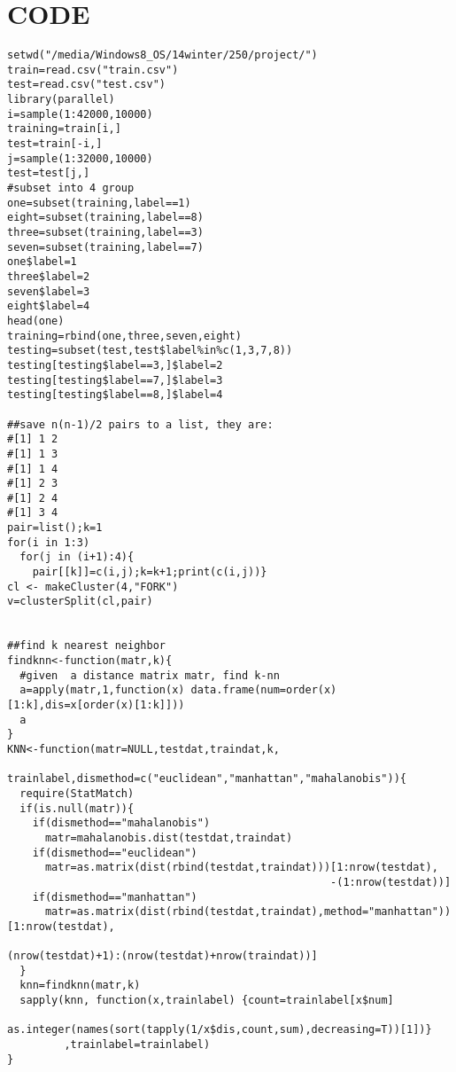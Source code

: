 \documentclass[12pt,a4paper]{article}
\begin{document}
\section{CODE}
\begin{verbatim}
setwd("/media/Windows8_OS/14winter/250/project/")
train=read.csv("train.csv")
test=read.csv("test.csv")
library(parallel)
i=sample(1:42000,10000)
training=train[i,]
test=train[-i,]
j=sample(1:32000,10000)
test=test[j,]
#subset into 4 group
one=subset(training,label==1)
eight=subset(training,label==8)
three=subset(training,label==3)
seven=subset(training,label==7)
one$label=1
three$label=2
seven$label=3
eight$label=4
head(one)
training=rbind(one,three,seven,eight)
testing=subset(test,test$label%in%c(1,3,7,8))
testing[testing$label==3,]$label=2
testing[testing$label==7,]$label=3
testing[testing$label==8,]$label=4

##save n(n-1)/2 pairs to a list, they are:
#[1] 1 2
#[1] 1 3
#[1] 1 4
#[1] 2 3
#[1] 2 4
#[1] 3 4
pair=list();k=1
for(i in 1:3)
  for(j in (i+1):4){
    pair[[k]]=c(i,j);k=k+1;print(c(i,j))}
cl <- makeCluster(4,"FORK")
v=clusterSplit(cl,pair)


##find k nearest neighbor
findknn<-function(matr,k){
  #given  a distance matrix matr, find k-nn
  a=apply(matr,1,function(x) data.frame(num=order(x)[1:k],dis=x[order(x)[1:k]]))
  a
}
KNN<-function(matr=NULL,testdat,traindat,k,
              trainlabel,dismethod=c("euclidean","manhattan","mahalanobis")){
  require(StatMatch)
  if(is.null(matr)){
    if(dismethod=="mahalanobis")
      matr=mahalanobis.dist(testdat,traindat)
    if(dismethod=="euclidean")
      matr=as.matrix(dist(rbind(testdat,traindat)))[1:nrow(testdat),
                                                   -(1:nrow(testdat))]
    if(dismethod=="manhattan")
      matr=as.matrix(dist(rbind(testdat,traindat),method="manhattan"))[1:nrow(testdat),
                                                                       (nrow(testdat)+1):(nrow(testdat)+nrow(traindat))]
  }
  knn=findknn(matr,k)
  sapply(knn, function(x,trainlabel) {count=trainlabel[x$num]
                                      as.integer(names(sort(tapply(1/x$dis,count,sum),decreasing=T))[1])}
         ,trainlabel=trainlabel)
}



\end{verbatim}
\end{document}
